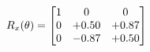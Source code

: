 \documentclass[preview]{standalone}
\begin{document}
\begin{align*}
\special{dvisvgm:raw <g id='unique000'>}R_{x}(\theta) = \begin{bmatrix}1 & 0 & 0 \\0 & +0.50 & +0.87 \\0 & -0.87 & +0.50\end{bmatrix}\special{dvisvgm:raw </g>}
\end{align*}
\end{document}

